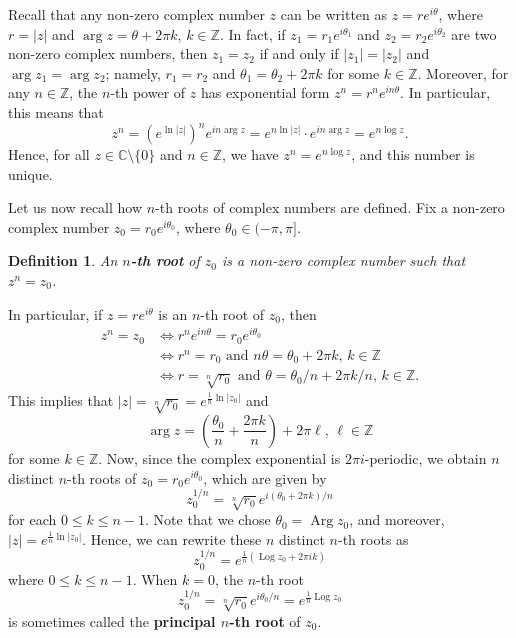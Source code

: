 \documentclass[10pt]{article}
\newcommand{\C}{\mathbb{C}}
\newcommand{\Z}{\mathbb{Z}}
\DeclareMathOperator{\Arg}{Arg}
\DeclareMathOperator{\Log}{Log}
\theoremstyle{newstyle}
\newtheorem{defn}[thm]{Definition}
\begin{document}
Recall that any non-zero complex number $z$ can be written as $z = re^{i\theta}$, 
where $r = |z|$ and $\arg z = \theta + 2\pi k$, $k \in \Z$. In fact, if 
$z_1 = r_1 e^{i\theta_1}$ and $z_2 = r_2 e^{i\theta_2}$ are two non-zero complex numbers, 
then $z_1 = z_2$ if and only if $|z_1| = |z_2|$ and $\arg z_1 = \arg z_2$; namely, 
$r_1 = r_2$ and $\theta_1 = \theta_2 + 2\pi k$ for some $k \in \Z$. Moreover, 
for any $n \in \Z$, the $n$-th power of $z$ has exponential form $z^n = r^n e^{in\theta}$. 
In particular, this means that 
\[ z^n = \left( e^{\ln|z|} \right)^n e^{in\arg z} = e^{n\ln|z|} \cdot e^{in \arg z} = e^{n \log z}. \]
Hence, for all $z \in \C \setminus \{0\}$ and $n \in \Z$, we have $z^n = e^{n\log z}$, 
and this number is unique. 

Let us now recall how $n$-th roots of complex numbers are defined. Fix a non-zero complex number 
$z_0 = r_0 e^{i\theta_0}$, where $\theta_0 \in (-\pi, \pi]$. 

\begin{defn}
An {\bf $n$-th root} of $z_0$ is a non-zero complex number such that $z^n = z_0$. 
\end{defn}

In particular, if $z = re^{i\theta}$ is an $n$-th root of $z_0$, then 
\begin{align*}
    z^n = z_0 &\iff r^n e^{in\theta} = r_0 e^{i\theta_0} \\
    &\iff r^n = r_0 \text{ and } n\theta = \theta_0 + 2\pi k,\, k \in \Z \\
    &\iff r = \sqrt[n]{r_0} \text{ and } \theta = \theta_0/n + 2\pi k/n,\, k \in \Z. 
\end{align*}
This implies that $|z| = \sqrt[n]{r_0} = e^{\frac1n\ln|z_0|}$ and 
\[ \arg z = \left( \frac{\theta_0}n + \frac{2\pi k}n \right) + 2\pi\ell,\, \ell \in \Z \]
for some $k \in \Z$. Now, since the complex exponential is $2\pi i$-periodic, we obtain 
$n$ distinct $n$-th roots of $z_0 = r_0 e^{i\theta_0}$, which are given by 
\[ z_0^{1/n} = \sqrt[n]{r_0} e^{i(\theta_0+2\pi k)/n} \]
for each $0 \leq k \leq n-1$. Note that we chose $\theta_0 = \Arg z_0$, and moreover, 
$|z| = e^{\frac1n\ln|z_0|}$. Hence, we can rewrite these $n$ distinct $n$-th roots as 
\[ z_0^{1/n} = e^{\frac1n(\Log z_0 + 2\pi ik)} \]
where $0 \leq k \leq n-1$. When $k = 0$, the $n$-th root 
\[ z_0^{1/n} = \sqrt[n]{r_0} e^{i\theta_0/n} = e^{\frac1n\Log z_0} \]
is sometimes called the {\bf principal $n$-th root} of $z_0$. 
\end{document}

